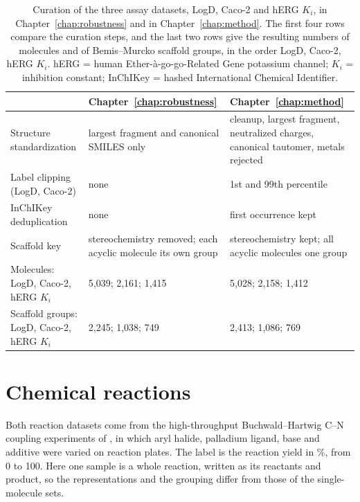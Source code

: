 \begin{table}[htbp]
\centering
\small
\caption[Curation of the three assay datasets in two chapters.]{Curation of the three assay datasets, LogD, Caco-2 and hERG $K_i$, in Chapter~\ref{chap:robustness} and in Chapter~\ref{chap:method}. The first four rows compare the curation steps, and the last two rows give the resulting numbers of molecules and of Bemis--Murcko scaffold groups, in the order LogD, Caco-2, hERG $K_i$. hERG = human Ether-\`a-go-go-Related Gene potassium channel; $K_i$ = inhibition constant; InChIKey = hashed International Chemical Identifier.}
\label{tab:curation_ch3_ch5}
\begin{adjustbox}{max width=\textwidth}
\begin{tabular}{P{3.4cm}P{4.8cm}P{4.8cm}}
\toprule
 & Chapter~\ref{chap:robustness} & Chapter~\ref{chap:method} \\
\midrule
Structure standardization & largest fragment and canonical SMILES only & cleanup, largest fragment, neutralized charges, canonical tautomer, metals rejected \\
Label clipping (LogD, Caco-2) & none & 1st and 99th percentile \\
InChIKey deduplication & none & first occurrence kept \\
Scaffold key & stereochemistry removed; each acyclic molecule its own group & stereochemistry kept; all acyclic molecules one group \\
Molecules: LogD, Caco-2, hERG $K_i$ & 5,039; 2,161; 1,415 & 5,028; 2,158; 1,412 \\
Scaffold groups: LogD, Caco-2, hERG $K_i$ & 2,245; 1,038; 749 & 2,413; 1,086; 769 \\
\bottomrule
\end{tabular}
\end{adjustbox}
\end{table}

\section{Chemical reactions}\label{app:datasets:reactions}

Both reaction datasets come from the high-throughput Buchwald--Hartwig C--N coupling experiments of \citet{Ahneman2018}, in which aryl halide, palladium ligand, base and additive were varied on reaction plates. The label is the reaction yield in \%, from 0 to 100. Here one sample is a whole reaction, written as its reactants and product, so the representations and the grouping differ from those of the single-molecule sets.

